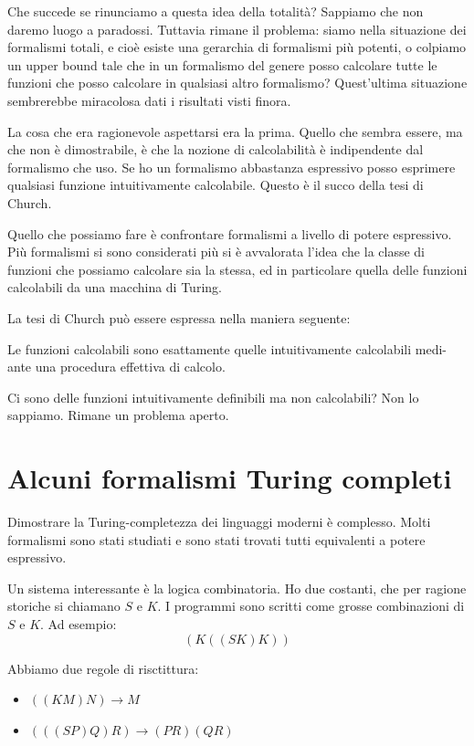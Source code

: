 Che succede se rinunciamo a questa idea della totalità? Sappiamo che non daremo luogo a paradossi.
Tuttavia rimane il problema: siamo nella situazione dei formalismi totali, e cioè esiste una
gerarchia di formalismi più potenti, o colpiamo un upper bound tale che in un formalismo del genere
posso calcolare tutte le funzioni che posso calcolare in qualsiasi altro formalismo?  Quest'ultima
situazione sembrerebbe miracolosa dati i risultati visti finora.

La cosa che era ragionevole aspettarsi era la prima. Quello che sembra essere, ma che non è
dimostrabile, è che la nozione di calcolabilità è indipendente dal formalismo che uso. Se ho un
formalismo abbastanza espressivo posso esprimere qualsiasi funzione intuitivamente calcolabile.
Questo è il succo della tesi di Church.

Quello che possiamo fare è confrontare formalismi a livello di potere espressivo. Più formalismi
si sono considerati più si è avvalorata l'idea che la classe di funzioni che possiamo calcolare sia
la stessa, ed in particolare quella delle funzioni calcolabili da una macchina di Turing.

La tesi di Church può essere espressa nella maniera seguente:
\begin{thm}
    Le funzioni calcolabili sono esattamente quelle intuitivamente calcolabili medi-
    ante una procedura effettiva di calcolo.
\end{thm}

Ci sono delle funzioni intuitivamente definibili ma non calcolabili? Non lo sappiamo. Rimane un
problema aperto.

\section{Alcuni formalismi Turing completi}

Dimostrare la Turing-completezza dei linguaggi moderni è complesso. Molti formalismi sono stati
studiati e sono stati trovati tutti equivalenti a potere espressivo.

Un sistema interessante è la logica combinatoria. Ho due costanti, che per ragione storiche si
chiamano $S$ e $K$. I programmi sono scritti come grosse combinazioni di $S$ e $K$. Ad esempio:
\begin{equation*}
    (K ((S K) K))
\end{equation*}

Abbiamo due regole di risctittura:
\begin{itemize}
    \item $((K M) N) \to M$ 
    \item $(((S P) Q) R) \to (P R) (Q R)$
\end{itemize}

